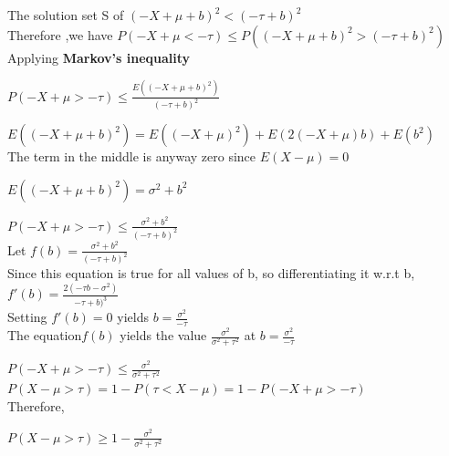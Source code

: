 \documentclass{article}
\begin{document}
    The solution set S of ${(-X+\mu + b)}^2 < {(-\tau +b)}^2$\\
    Therefore ,we have $P(-X + \mu < -\tau ) \leq P({(-X+\mu + b)}^2 > {(-\tau +b)}^2)$\\
    Applying \textbf{Markov's inequality}\par 
    $P(-X +\mu > -\tau ) \leq \frac{E({(-X+\mu + b)}^2)}{{(-\tau +b)}^2}$\par 
    $E({(-X+\mu + b)}^2) = E({(-X+\mu)}^2) + E(2(-X+\mu)b) + E(b^2)$\\
    The term in the middle is anyway zero since $E(X-\mu) = 0 $\par 
    $E({(-X+\mu + b)}^2) = \sigma^2 + b^2$\par 
    $P(-X +\mu > -\tau ) \leq \frac{\sigma^2 + b^2}{{(-\tau +b)}^2}$\\
    Let $f(b) = \frac{\sigma^2 + b^2}{{(-\tau +b)}^2}$\\
    Since this equation is true for all values of b, so differentiating it w.r.t b,\\
    $f'(b) = \frac{2(-\tau b -\sigma^2)}{{-\tau +b)}^3}$\\
    Setting $f'(b) = 0 $ yields $b = \frac{\sigma^2}{-\tau}$\\
    The equation$f(b)$ yields the value $\frac{\sigma^2}{\sigma^2 +\tau^2}$ at $b =\frac{\sigma^2}{-\tau} $\par
    $P(-X + \mu > -\tau ) \leq \frac{\sigma^2}{\sigma^2 +\tau^2}$\\
    $P(X- \mu > \tau ) = 1- P(\tau < X -\mu) = 1 - P(-X + \mu > -\tau )$\\
    Therefore,\par 
    $P(X- \mu > \tau ) \geq 1 - \frac{\sigma^2}{\sigma^2 +\tau^2}$\\
\end{document}
